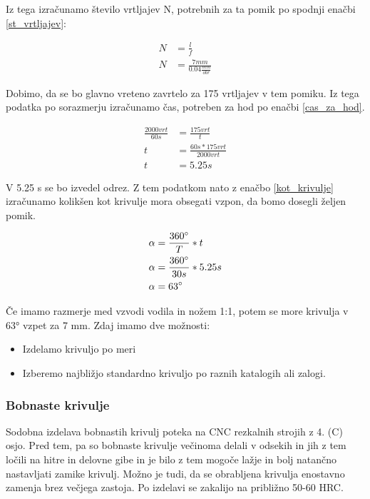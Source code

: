 Iz tega izračunamo število vrtljajev N, potrebnih za ta pomik po spodnji enačbi \ref{st_vrtljajev}:

\begin{equation}
	\label{st_vrtljajev}
	\begin{split}
		N &= \frac{l}{f} \\
		N &= \frac{7mm}{0.04\frac{mm}{obr}}
	\end{split}
\end{equation}

Dobimo, da se bo glavno vreteno zavrtelo za 175 vrtljajev v tem
pomiku. Iz tega podatka po sorazmerju izračunamo čas, potreben
za hod po enačbi \ref{cas_za_hod}.

\begin{equation}
	\label{cas_za_hod}
	\begin{split}
		\frac{2000vrt}{60s} &= \frac{175vrt}{t} \\
		t &= \frac{60s * 175vrt}{2000vrt} \\
		t &= 5.25s
	\end{split}
\end{equation}

V 5.25 s se bo izvedel odrez. Z tem podatkom nato z enačbo \ref{kot_krivulje} izračunamo
kolikšen kot krivulje mora obsegati vzpon, da bomo dosegli željen pomik.

\begin{equation}
	\label{kot_krivulje}
	\begin{split}
		\alpha &= \frac{360\degree}{T} * t \\
		\alpha &= \frac{360\degree}{30s} * 5.25s \\
		\alpha &= 63\degree
	\end{split}
\end{equation}

Če imamo razmerje med vzvodi vodila in nožem 1:1, potem se more krivulja v 63° vzpet za 7 mm.
Zdaj imamo dve možnosti:
\begin{itemize}
	\item Izdelamo krivuljo po meri
	\item Izberemo najbližjo standardno krivuljo po raznih katalogih ali zalogi.
\end{itemize}

\newpage
\subsubsection{Bobnaste krivulje}
Sodobna izdelava bobnastih krivulj poteka na CNC rezkalnih strojih
z 4. (C) osjo. Pred tem, pa so bobnaste krivulje večinoma delali v
odsekih in jih z tem ločili na hitre in delovne gibe in je bilo z tem
mogoče lažje in bolj natančno nastavljati zamike krivulj.
Možno je tudi, da se obrabljena krivulja enostavno zamenja brez
večjega zastoja. Po izdelavi se zakalijo na približno 50-60 HRC.

